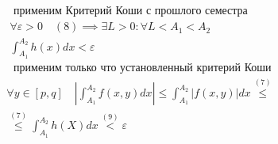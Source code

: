 \documentclass[main]{subfiles}
\begin{document}
               \begin{longProof}
          \begin{gather*}
               \text{ применим Критерий Коши с прошлого семестра}\\
               \forall \varepsilon > 0 \quad (8) \implies \exists L > 0 : \forall L < A_1 < A_2 \\
               \int^{A_2}_{A_1} h(x) dx < \varepsilon \tag{9} \\
               \text{ применим только что установленный критерий Коши} \end{gather*}
               \begin{multline*}
               \forall y \in [p,q] \quad \left | \int^{A_2}_{A_1} f(x,y) dx \right | \leq \int_{A_1}^{A_2} |f(x,y)| dx \stackrel{(7)}{\leq}  \\
               \stackrel{(7)}{\leq} \int^{A_2}_{A_1} h(X) dx \stackrel{(9)}{<} \varepsilon \tag{10}
          \end{multline*}
     \end{longProof}
\end{document}
